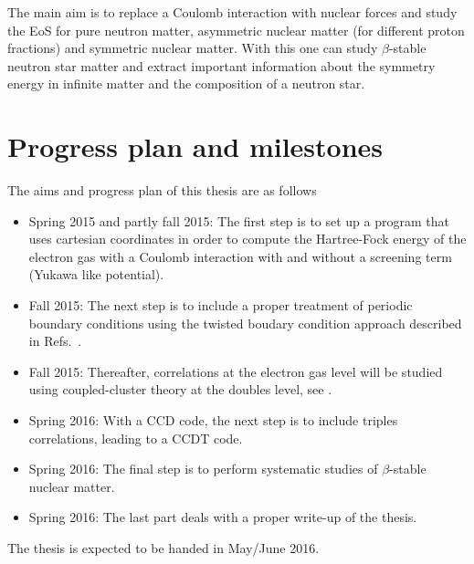 \documentclass[aps,prc,twocolumn,showpacs,floatfix,nofootinbib,preprintnumbers,superscriptaddress,amsmath,amssymb]{revtex4-1}
\begin{document}
The main aim  is to replace a Coulomb interaction with
nuclear forces and study the EoS for pure neutron matter, asymmetric
nuclear matter (for different proton fractions) and symmetric nuclear
matter. With this one can study $\beta$-stable neutron star matter and
extract important information about the symmetry energy in infinite
matter and the composition of a neutron star.

\section*{Progress plan and milestones}
The aims and progress plan of this thesis are as follows
\begin{itemize}
\item Spring 2015 and partly fall 2015:  The first step is to set up a program that uses cartesian coordinates in order to compute the Hartree-Fock 
energy of the electron gas with a Coulomb interaction with and without a screening term (Yukawa like potential). 
\item Fall 2015:  The next step is to include a proper treatment of periodic boundary conditions using the twisted boudary condition
approach described in Refs.~\cite{gros1992,gros1996,lin2001}.
\item Fall 2015: Thereafter, correlations at the electron gas level
  will be studied using coupled-cluster theory at the doubles level,
  see \cite{shavittbartlett2009}.
\item Spring 2016: With a CCD code, the next step is to include triples correlations, leading to a CCDT code.
\item Spring 2016: The final step is to perform systematic studies of  $\beta$-stable nuclear matter.
\item Spring 2016: The last part deals with a proper write-up of the thesis. 
\end{itemize}
 
The thesis is expected to be handed in May/June 2016.
\end{document}
